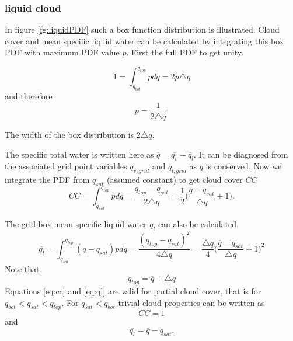\documentclass[a4paper,11pt]{article}
\begin{document}
\subsubsection{liquid cloud}

In figure \ref{fg:liquidPDF} such a box function distribution is illustrated.  Cloud cover
and mean specific liquid water can be calculated by integrating this box PDF with maximum 
PDF value $p$.  First the full PDF to get unity.

\begin{equation}
1 =  \int_{q_{bot}}^{q_{top}} p dq = 2 p \triangle q 
\end{equation}
and therefore
\begin{equation}
p = \frac{1}{2 \triangle q }.
\end{equation}

The width of the box distribution is $2 \triangle q$. 

The specific total water is written here as $\overline{q}=\overline{q_v} + \overline{q_l}$.  It can be diagnosed from the associated 
grid point variables $q_{v,grid}$ and $q_{l,grid}$ as $\overline{q}$ is conserved.  
Now we integrate the PDF from $q_{sat}$ (assumed constant) to get cloud cover $CC$
\begin{equation}
CC =  \int_{q_{sat}}^{q_{top}} p dq = \frac{q_{top}-q_{sat}}{2 \triangle q} 
= \frac{1}{2}\Big(\frac{\overline{q}-q_{sat}}{\triangle q}+1\Big).
\label{eq:cc}
\end{equation}

The grid-box mean specific liquid water $q_{l}$ can also be calculated.
\begin{equation}
\overline{q_l} =  \int_{q_{sat}}^{q_{top}} (q - q_{sat}) p dq = \frac{(q_{top}-q_{sat})^2}{4 \triangle q} 
= \frac{\triangle q}{4}\Big(\frac{\overline{q}-q_{sat}}{\triangle q}+1\Big)^2
\label{eq:ql}
\end{equation}
%
Note that 
\begin{equation}
q_{top} = \overline{q} + \triangle q 
\end{equation}
%
Equations \ref{eq:cc} and \ref{eq:ql} are valid for partial cloud cover, that is for $q_{bot} < q_{sat} < q_{top}$.
For $q_{sat} < q_{bot}$ trivial cloud properties can be written as
\begin{equation}
CC = 1
\end{equation}
and
\begin{equation}
\overline{q_l} =  \overline{q} - q_{sat}.
\end{equation}
\end{document}
